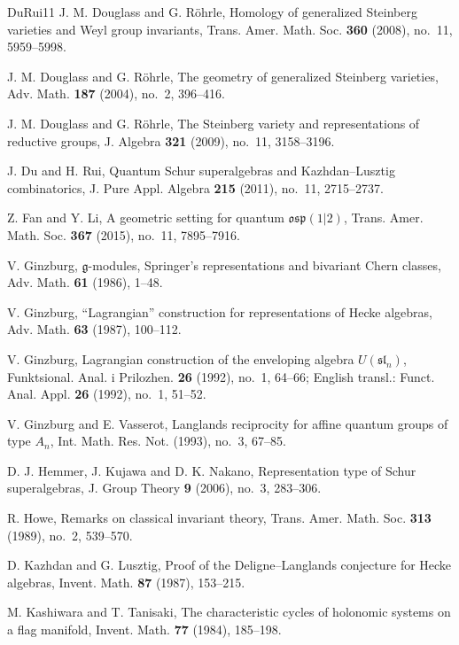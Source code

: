 \documentclass[11pt,a4paper]{amsart}
\theoremstyle{definition}
\theoremstyle{remark}
\numberwithin{equation}{section}
\begin{document}
\begin{thebibliography}{DuRui11}
J. M. Douglass and G. R\"ohrle,
Homology of generalized Steinberg varieties and Weyl group invariants,
Trans. Amer. Math. Soc. \textbf{360} (2008), no.~11, 5959--5998.

J. M. Douglass and G. R\"ohrle,
The geometry of generalized Steinberg varieties,
Adv. Math. \textbf{187} (2004), no.~2, 396--416.

J. M. Douglass and G. R\"ohrle,
The Steinberg variety and representations of reductive groups,
J. Algebra \textbf{321} (2009), no.~11, 3158--3196.

J. Du and H. Rui,
Quantum Schur superalgebras and Kazhdan--Lusztig combinatorics,
J. Pure Appl. Algebra \textbf{215} (2011), no.~11, 2715--2737.

Z. Fan and Y. Li,
A geometric setting for quantum $\mathfrak{osp}(1|2)$,
Trans. Amer. Math. Soc. \textbf{367} (2015), no.~11, 7895--7916.

V. Ginzburg, $\mathfrak g$-modules, Springer's representations and bivariant Chern
classes, Adv. Math. \textbf{61} (1986), 1--48.

V. Ginzburg,
``Lagrangian'' construction for representations of Hecke algebras,
Adv. Math. \textbf{63} (1987), 100--112.

V. Ginzburg,
Lagrangian construction of the enveloping algebra $U(\mathfrak{sl}_n)$,
Funktsional. Anal. i Prilozhen. \textbf{26} (1992), no.~1, 64--66;
English transl.: Funct. Anal. Appl. \textbf{26} (1992), no.~1, 51--52.

V. Ginzburg and E. Vasserot,
Langlands reciprocity for affine quantum groups of type $A_n$,
Int. Math. Res. Not. (1993), no.~3, 67--85.

D. J. Hemmer, J. Kujawa and D. K. Nakano,
Representation type of Schur superalgebras,
J. Group Theory \textbf{9} (2006), no.~3, 283--306.

R. Howe,
Remarks on classical invariant theory,
Trans. Amer. Math. Soc. \textbf{313} (1989), no.~2, 539--570.

D. Kazhdan and G. Lusztig,
Proof of the Deligne--Langlands conjecture for Hecke algebras,
Invent. Math. \textbf{87} (1987), 153--215.

M. Kashiwara and T. Tanisaki,
The characteristic cycles of holonomic systems on a flag manifold,
Invent. Math. \textbf{77} (1984), 185--198.


\end{thebibliography}
\end{document}
